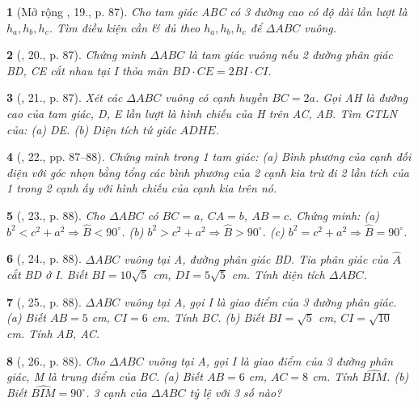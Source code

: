 \documentclass{article}
\newtheorem{baitoan}{}
\begin{document}
\begin{baitoan}[Mở rộng \cite{Binh_Toan_9_tap_1}, 19., p. 87]
	Cho tam giác ABC có 3 đường cao có độ dài lần lượt là $h_a,h_b,h_c$. Tìm điều kiện cần \& đủ theo $h_a,h_b,h_c$ để $\Delta ABC$ vuông.
\end{baitoan}

\begin{baitoan}[\cite{Binh_Toan_9_tap_1}, 20., p. 87]
	Chứng minh $\Delta ABC$ là tam giác vuông nếu 2 đường phân giác BD, CE cắt nhau tại I thỏa mãn $BD\cdot CE = 2BI\cdot CI$.
\end{baitoan}

\begin{baitoan}[\cite{Binh_Toan_9_tap_1}, 21., p. 87]
	Xét các $\Delta ABC$ vuông có cạnh huyền $BC = 2a$. Gọi AH là đường cao của tam giác, D, E lần lượt là hình chiếu của H trên AC, AB. Tìm {\rm GTLN} của: (a) DE. (b) Diện tích tứ giác $ADHE$.
\end{baitoan}

\begin{baitoan}[\cite{Binh_Toan_9_tap_1}, 22., pp. 87--88]
	Chứng minh trong 1 tam giác: (a) Bình phương của cạnh đối diện với góc nhọn bằng tổng các bình phương của 2 cạnh kia trừ đi 2 lần tích của 1 trong 2 cạnh ấy với hình chiếu của cạnh kia trên nó.
\end{baitoan}

\begin{baitoan}[\cite{Binh_Toan_9_tap_1}, 23., p. 88]
	Cho $\Delta ABC$ có $BC = a$, $CA = b$, $AB = c$. Chứng minh: (a) $b^2 < c^2 + a^2\Rightarrow\widehat{B} < 90^\circ$. (b) $b^2 > c^2 + a^2\Rightarrow\widehat{B} > 90^\circ$. (c) $b^2 = c^2 + a^2\Rightarrow\widehat{B} = 90^\circ$.
\end{baitoan}

\begin{baitoan}[\cite{Binh_Toan_9_tap_1}, 24., p. 88]
	$\Delta ABC$ vuông tại A, đường phân giác BD. Tia phân giác của $\widehat{A}$ cắt BD ở I. Biết $BI = 10\sqrt{5}$ {\rm cm}, $DI = 5\sqrt{5}$ {\rm cm}. Tính diện tích $\Delta ABC$.
\end{baitoan}

\begin{baitoan}[\cite{Binh_Toan_9_tap_1}, 25., p. 88]
	$\Delta ABC$ vuông tại A, gọi I là giao điểm của 3 đường phân giác. (a) Biết $AB = 5$ {\rm cm}, $CI = 6$ {\rm cm}. Tính BC. (b) Biết $BI = \sqrt{5}$ {\rm cm}, $CI = \sqrt{10}$ {\rm cm}. Tính AB, AC.
\end{baitoan}

\begin{baitoan}[\cite{Binh_Toan_9_tap_1}, 26., p. 88]
	Cho $\Delta ABC$ vuông tại A, gọi I là giao điểm của 3 đường phân giác, M là trung điểm của BC. (a) Biết $AB = 6$ {\rm cm}, $AC = 8$ {\rm cm}. Tính $\widehat{BIM}$. (b) Biết $\widehat{BIM} = 90^\circ$. 3 cạnh của $\Delta ABC$ tỷ lệ với 3 số nào?
\end{baitoan}
\end{document}
